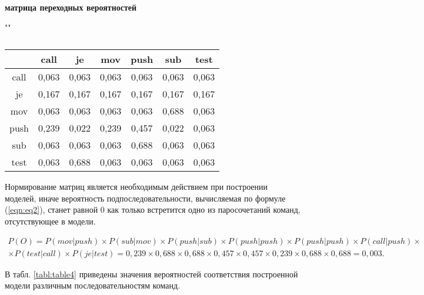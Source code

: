\documentclass{book}
\begin{document}
\begin{table}[h!]

	\caption {\label{tabl:table3}}
	
	\centering
	\textbf{ матрица переходных вероятностей}

	\par{""}

	\begin{tabular}{c|c|c|c|c|c|c|}
		\cline{2-7}
		& call  & je    & mov   & push  & sub   & test  \\ \hline
		\multicolumn{1}{|c|}{call} & 0,063 & 0,063 & 0,063 & 0,063 & 0,063 & 0,063 \\ \hline
		\multicolumn{1}{|c|}{je}   & 0,167 & 0,167 & 0,167 & 0,167 & 0,167 & 0,167 \\ \hline
		\multicolumn{1}{|c|}{mov}  & 0,063 & 0,063 & 0,063 & 0,063 & 0,688 & 0,063 \\ \hline
		\multicolumn{1}{|c|}{push} & 0,239 & 0,022 & 0,239 & 0,457 & 0,022 & 0,063 \\ \hline
		\multicolumn{1}{|c|}{sub}  & 0,063 & 0,063 & 0,063 & 0,688 & 0,063 & 0,063 \\ \hline
		\multicolumn{1}{|c|}{test} & 0,063 & 0,688 & 0,063 & 0,063 & 0,063 & 0,063 \\ \hline
	\end{tabular}
\end{table}

Нормирование матриц является необходимым действием при построении моделей, иначе вероятность 
подпоследовательности, вычисляемая по формуле (\ref{eqn:eq2}), станет равной 0 как только 
встретится одно из паросочетаний команд, отсутствующее в модели.
\begin{normalsize}
	\begin{equation}\label{eqn:eq4}
		\begin{gathered}
			P(O) = P(mov|push) \times P(sub|mov)\times P(push|sub)
			\times P(push|push) \times P(push|push)\times P(call|push)\times \\
			\times P(test|call) \times P(je|test) = 0,239 \times 0,688 \times 0,688 
			\times 0,457 \times 0,457 \times 0,239 \times 0,688 \times 0,688 = 0,003.
		\end{gathered}
	\end{equation}
\end{normalsize}

В табл. \ref{tabl:table4} приведены значения вероятностей соответствия построенной модели 
различным последовательностям команд.
\end{document}
